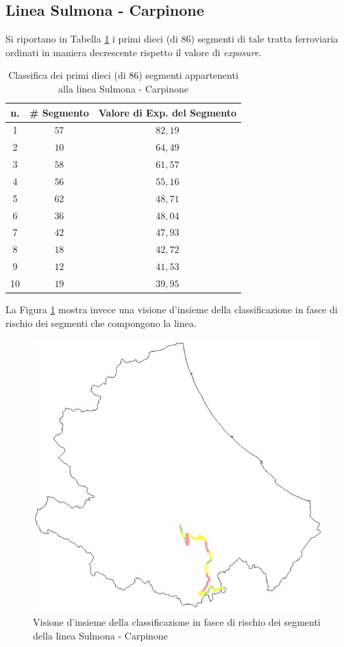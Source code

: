 \subsection{Linea Sulmona - Carpinone}
Si riportano in Tabella \ref{classificasulmonacarpinone} i primi dieci (di 86) segmenti di tale tratta ferroviaria ordinati in maniera decrescente rispetto il valore di \textit{exposure}.
\begin{table}[h]
\centering
\begin{tabular}{|c|c|c|}
\hline
\rowcolor{lightgray}
n. & \# Segmento & Valore di Exp. del Segmento \\ \hline \rowcolor{flamingopink}
1  & $57$        & $82,19$                      \\ \hline \rowcolor{flamingopink}
2  & $10$        & $64,49$                      \\ \hline \rowcolor{flamingopink}
3  & $58$        & $61,57$                      \\ \hline \rowcolor{flamingopink}
4  & $56$        & $55,16$                      \\ \hline \rowcolor{flamingopink}
5  & $62$        & $48,71$                      \\ \hline \rowcolor{flamingopink}
6  & $36$        & $48,04$                      \\ \hline \rowcolor{flamingopink}
7  & $42$       & $47,93$                      \\ \hline \rowcolor{flamingopink}
8  & $18$        & $42,72$                      \\ \hline \rowcolor{flamingopink}
9  & $12$        & $41,53$                      \\ \hline \rowcolor{flamingopink}
10 & $19$        & $39,95$                      \\ \hline
\end{tabular}
\caption{Classifica dei primi dieci (di 86) segmenti appartenenti alla linea Sulmona - Carpinone}
\label{classificasulmonacarpinone}
\end{table}
\newline
La Figura \ref{sulmonacarpinone} mostra invece una visione d'insieme della classificazione in fasce di rischio dei segmenti che compongono la linea.
\begin{figure}[h]
\centering
\includegraphics[width=0.4\linewidth]{img/sulmonacarpinone.jpeg}
\caption{Visione d'insieme della classificazione in fasce di rischio dei segmenti della linea Sulmona - Carpinone}
\label{sulmonacarpinone}
\end{figure}
